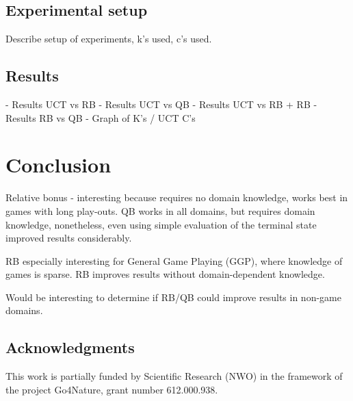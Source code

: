 \documentclass{ecai2010}
\begin{document}
\subsection{Experimental setup}
Describe setup of experiments, k's used, c's used.

\subsection{Results}
- Results UCT vs RB
- Results UCT vs QB
- Results UCT vs RB + RB
- Results RB vs QB
- Graph of K's / UCT C's

\section{Conclusion}
Relative bonus - interesting because requires no domain knowledge, works best in games with long play-outs.
QB works in all domains, but requires domain knowledge, nonetheless, even using simple evaluation of the terminal state improved results considerably.

RB especially interesting for General Game Playing (GGP), where knowledge of games is sparse. RB improves results without domain-dependent knowledge.

Would be interesting to determine if RB/QB could improve results in non-game domains.

\subsection*{Acknowledgments}
This work is partially funded by Scientific Research (NWO) in the framework of the project Go4Nature, grant number 612.000.938.

\end{document}
